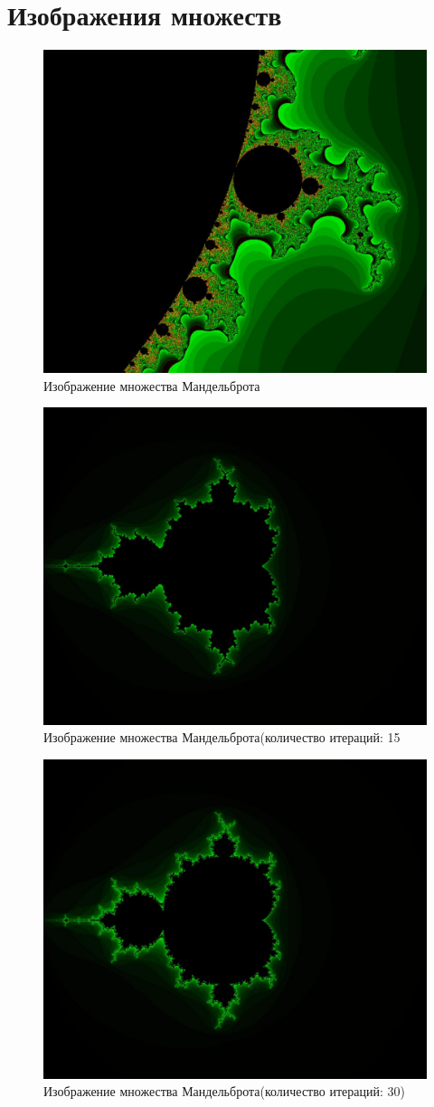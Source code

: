 \documentclass{article}
\begin{document}
\section{Изображения множеств}
\begin{figure}[H]
   \centering
   \includegraphics[width=0.5\linewidth]{mandelbroth.jpg}
   \caption{Изображение множества Мандельброта}
   \label{fig:enter-label}
\end{figure}
\begin{figure}
   \centering
   \includegraphics[width=0.5\linewidth]{m15.jpg}
   \caption{Изображение множества Мандельброта(количество итераций: 15}
   \label{fig:enter-label}
\end{figure}
\begin{figure}
   \centering
   \includegraphics[width=0.5\linewidth]{m30.jpg}
   \caption{Изображение множества Мандельброта(количество итераций: 30)}
   \label{fig:enter-label}
\end{figure}
\end{document}
